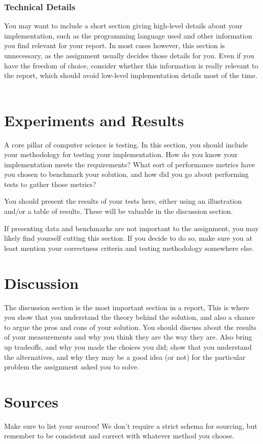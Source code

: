\begin{flushleft}
\subsubsection{Technical Details}
You may want to include a short section giving high-level details about your implementation, such as the programming language used and other information you find relevant for your report. In most cases however, this section is unnecessary, as the assignment usually decides those details for you. Even if you have the freedom of choice, consider whether this information is really relevant to the report, which should avoid low-level implementation details most of the time. \ 

\section{Experiments and Results}
A core pillar of computer science is testing. In this section, you should include your methodology for testing your implementation. How do you know your implementation meets the requirements? What sort of performance metrics have you chosen to benchmark your solution, and how did you go about performing tests to gather those metrics?

\bigskip

You should present the results of your tests here, either using an illustration and/or a table of results. These will be valuable in the discussion section.

\bigskip

If presenting data and benchmarks are not important to the assignment, you may likely find yourself cutting this section. If you decide to do so, make sure you at least mention your correctness criteria and testing methodology somewhere else.

\section[Discussion]{Discussion}
The discussion section is the most important section in a report, This is where you show that you understand the theory behind the solution, and also a chance to argue the pros and cons of your solution. You should discuss about the results of your measurements and why you think they are the way they are. Also bring up tradeoffs, and why you made the choices you did; show that you understand the alternatives, and why they may be a good idea (or not) for the particular problem the assignment asked you to solve.

\section{Sources}
Make sure to list your sources! We don't require a strict schema for sourcing, but remember to be consistent and correct with whatever method you choose.


\bigskip
\end{flushleft}

